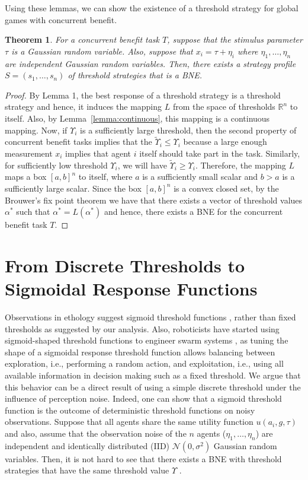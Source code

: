 \documentclass[12pt]{book}
\newtheorem{theorem}{Theorem}
\newcommand{\R}{\mathbb{R}}    %
\newcommand{\td}{\Upsilon}   %
\begin{document}
Using these lemmas, we can show the existence of a threshold strategy for global games with concurrent benefit. 
\begin{theorem}\label{thrm:mainthrm}
For a concurrent benefit task $T$, suppose that the stimulus parameter $\tau$ is a Gaussian random variable. Also, suppose that $x_i=\tau+\eta_i$ where $\eta_1,\ldots,\eta_n$ are independent Gaussian random variables. Then, there exists a strategy profile $S=(s_1,\ldots,s_n)$ of threshold strategies that is a BNE.
\end{theorem}
\begin{proof}
By Lemma 1, the best response of a threshold strategy is a threshold strategy and hence, it induces the mapping $L$ from the space of thresholds $\R^n$ to itself. Also, by Lemma~\ref{lemma:continuous}, this mapping is a continuous mapping. Now, if $\td_i$ is a sufficiently large threshold, then the second property of concurrent benefit tasks implies that the $\tilde{\td}_i\leq \td_i$ because a large enough measurement $x_i$ implies that agent $i$ itself should take part in the task. Similarly, for sufficiently low threshold $\td_i$, we will have $\tilde{\td}_i\geq \td_i$. Therefore, the mapping $L$ maps a box $[a,b]^n$ to itself, where $a$ is a sufficiently small scalar and $b>a$ is a sufficiently large scalar. Since the box $[a,b]^n$ is a convex closed set, by the Brouwer's fix point theorem \cite{Border1990} we have that there exists a vector of threshold values $\alpha^*$ such that $\alpha^*=L(\alpha^*)$ and hence, there exists a BNE for the concurrent benefit task $T$.
\end{proof}

\section{From Discrete Thresholds to\\Sigmoidal Response Functions}\label{sec:continuous}
Observations in ethology suggest sigmoid threshold functions \cite{Bonabeau1996}, rather than fixed thresholds as suggested by our analysis. Also, roboticists have started using sigmoid-shaped threshold functions to engineer swarm systems \cite{Bonabeau1996,Theraulaz1998,Krieger2000}, as tuning the shape of a sigmoidal response threshold function allows balancing between exploration, i.e., performing a random action, and exploitation, i.e., using all available information in decision making such as a fixed threshold. 
We argue that this behavior can be a direct result of using a simple discrete threshold under the influence of perception noise. Indeed, one can show that a sigmoid threshold function is the outcome of deterministic threshold functions on noisy observations. Suppose that all  agents share the same utility function $u(a_i,g,\tau)$ and also, assume that the observation noise of the $n$ agents ($\eta_1,\ldots,\eta_n$) are independent and identically distributed (IID) $\mathcal{N}(0,\sigma^2)$ Gaussian random variables. Then, it is not hard to see that there exists a BNE with threshold strategies that have the same threshold value $\td$ \cite{Morris2000}.
\end{document}
